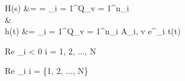 \begin{abox}
	H(s) &=  \cdot {} = \sum_{i = 1}^{Q}\sum_{v = 1}^{n_i} \\
	&\ztrans\\
	h(t) &= \sum_{i = 1}^{Q}\sum_{v = 1}^{n_i} A_{i, v} \cdot {}e^{\lambda_i t}\epsilon(t)
\end{abox}

\begin{abox}
	Re \lambda_i < 0  i = 1, 2, ..., N
\end{abox}

\begin{abox}
	Re \lambda_i   i = \{1, 2, ..., N\}
\end{abox}